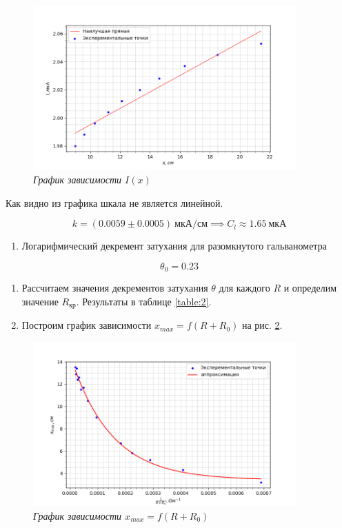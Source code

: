 \documentclass[a4paper,12pt]{article}
\begin{document}
\FloatBarrier
\begin{figure}[!ht]
    \centering
	\includegraphics[width=0.9\textwidth]{graph-1.png}
	\caption{\textit{График зависимости $I(x)$}}
	\label{graph:1}
\end{figure}
\FloatBarrier

Как видно из графика шкала не является линейной.

\begin{equation*}
    k = (0.0059 \pm 0.0005) \ \text{мкА}/\text{см} \implies C_l \approx 1.65 \ \text{мкА}
\end{equation*}

\begin{enumerate}[resume]
    \item Логарифмический декремент затухания для разомкнутого гальванометра
\end{enumerate}

\begin{equation*}
    \theta_0 = 0.23
\end{equation*}

\begin{enumerate}[resume]
    \item Рассчитаем значения декрементов затухания $\theta$ для каждого $R$ и определим значение $R_\text{кр}$. Результаты в таблице \ref{table:2}.
    \item Построим график зависимости $x_{max} = f(R + R_0)$ на рис. \ref{graph:2}.
\end{enumerate}

\FloatBarrier
\begin{figure}[!ht]
    \centering
	\includegraphics[width=0.9\textwidth]{graph-2.png}
	\caption{\textit{График зависимости $x_{max} = f(R + R_0)$}}
	\label{graph:2}
\end{figure}
\FloatBarrier
\end{document}
